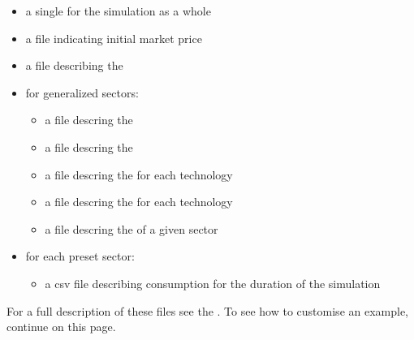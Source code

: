 \documentclass[letterpaper,10pt,english]{sphinxmanual}
\begin{document}
\begin{itemize}
\item {} 
a single {\hyperref[\detokenize{inputs/toml::doc}]{}} for the simulation as a whole

\item {} 
a file indicating initial market price {\hyperref[\detokenize{inputs/projections::doc}]{}}

\item {} 
a file describing the {\hyperref[\detokenize{inputs/commodities::doc}]{}}

\item {} 
for generalized sectors:
\begin{itemize}
\item {} 
a file descring the {\hyperref[\detokenize{inputs/agents::doc}]{}}

\item {} 
a file descring the {\hyperref[\detokenize{inputs/technodata::doc}]{}}

\item {} 
a file descring the {\hyperref[\detokenize{inputs/commodities_io::doc}]{}} for each technology

\item {} 
a file descring the {\hyperref[\detokenize{inputs/commodities_io::doc}]{}} for each technology

\item {} 
a file descring the {\hyperref[\detokenize{inputs/existing_capacity::doc}]{}} of a given sector

\end{itemize}

\item {} 
for each preset sector:
\begin{itemize}
\item {} 
a csv file describing consumption for the duration of the simulation

\end{itemize}

\end{itemize}

For a full description of these files see the {\hyperref[\detokenize{inputs/index::doc}]{}}. To see how to customise an example, continue on this page.
\end{document}

